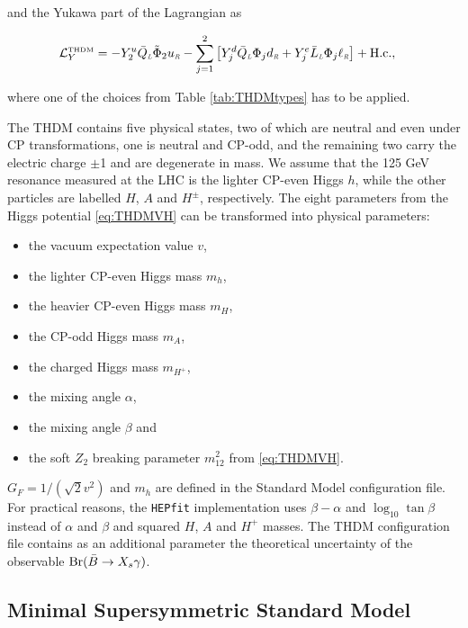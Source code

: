 \documentclass[preprint,3p,12pt]{elsarticle}
\newcommand{\HEPfit}{\texttt{HEPfit}\xspace}
\begin{document}
{and the Yukawa part of the Lagrangian as
 
\begin{align}
{\cal L}_Y^\text{\tiny{THDM}} &= -Y^u_2 \bar Q_{\textit{\tiny{L}}} \tilde\Phi_2 u_{\textit{\tiny{R}}} -\sum\limits_{j=1}^2 \left[ Y^d_j \bar Q_{\textit{\tiny{L}}} \Phi_j d_{\textit{\tiny{R}}} +Y^e_j \bar L_{\textit{\tiny{L}}} \Phi_j \ell_{\textit{\tiny{R}}}\right] + {\text{H.c.}} \nonumber ,
\end{align}
 
where one of the choices from Table \ref{tab:THDMtypes} has to be applied.

The THDM contains five physical states, two of which are neutral and even under CP transformations, one is neutral and CP-odd, and the remaining two carry the electric charge $\pm$1 and are degenerate in mass. We assume that the 125 GeV resonance measured at the LHC is the lighter CP-even Higgs $h$, while the other particles are labelled $H$, $A$ and $H^\pm$, respectively.
The eight parameters from the Higgs potential \eqref{eq:THDMVH} can be transformed into physical parameters:

\begin{itemize}
\item the vacuum expectation value $v$,
\item the lighter CP-even Higgs mass $m_h$,
\item the heavier CP-even Higgs mass $m_H$,
\item the CP-odd Higgs mass $m_A$,
\item the charged Higgs mass $m_{H^+}$,
\item the mixing angle $\alpha$,
\item the mixing angle $\beta$ and
\item the soft $Z_2$ breaking parameter $m_{12}^2$ from \eqref{eq:THDMVH}.
\end{itemize}

$G_F=1/(\sqrt{2} v^2)$ and $m_h$ are defined in the Standard Model configuration file. For practical reasons, the \HEPfit implementation uses $\beta-\alpha$ and $\log_{10}\tan\beta$ instead of $\alpha$ and $\beta$ and squared $H$, $A$ and $H^+$ masses. The THDM configuration file contains as an additional parameter the theoretical uncertainty of the observable ${\rm Br}(\bar{B}\to X_s\gamma)$.

\subsection{Minimal Supersymmetric Standard Model}
\label{sec:MSSM}

}
\end{document}
